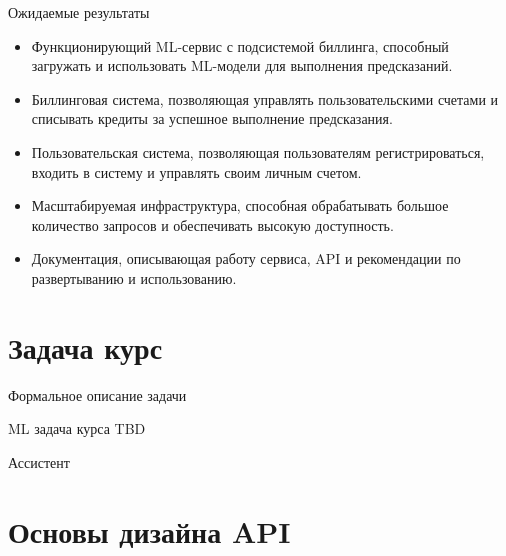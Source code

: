 \documentclass[
  ignorenonframetext,
  aspectratio=169,
  aspectratio=169]{beamer}
\providecommand{\tightlist}{%
  \setlength{\itemsep}{0pt}\setlength{\parskip}{0pt}}
\begin{document}
\begin{frame}{Ожидаемые результаты}
\protect\hypertarget{ux43eux436ux438ux434ux430ux435ux43cux44bux435-ux440ux435ux437ux443ux43bux44cux442ux430ux442ux44b}{}
\begin{itemize}
\tightlist
\item
  Функционирующий ML-сервис с подсистемой биллинга, способный загружать
  и использовать ML-модели для выполнения предсказаний.
\item
  Биллинговая система, позволяющая управлять пользовательскими счетами и
  списывать кредиты за успешное выполнение предсказания.
\item
  Пользовательская система, позволяющая пользователям регистрироваться,
  входить в систему и управлять своим личным счетом.
\item
  Масштабируемая инфраструктура, способная обрабатывать большое
  количество запросов и обеспечивать высокую доступность.
\item
  Документация, описывающая работу сервиса, API и рекомендации по
  развертыванию и использованию.
\end{itemize}
\end{frame}

\hypertarget{ux437ux430ux434ux430ux447ux430-ux43aux443ux440ux441}{%
\section{Задача
курс}\label{ux437ux430ux434ux430ux447ux430-ux43aux443ux440ux441}}

\begin{frame}{Формальное описание задачи}
\protect\hypertarget{ux444ux43eux440ux43cux430ux43bux44cux43dux43eux435-ux43eux43fux438ux441ux430ux43dux438ux435-ux437ux430ux434ux430ux447ux438}{}
\end{frame}

\begin{frame}{ML задача курса}
\protect\hypertarget{ml-ux437ux430ux434ux430ux447ux430-ux43aux443ux440ux441ux430}{}
TBD

Ассистент
\end{frame}

\hypertarget{ux43eux441ux43dux43eux432ux44b-ux434ux438ux437ux430ux439ux43dux430-api}{%
\section{Основы дизайна
API}\label{ux43eux441ux43dux43eux432ux44b-ux434ux438ux437ux430ux439ux43dux430-api}}
\end{document}
